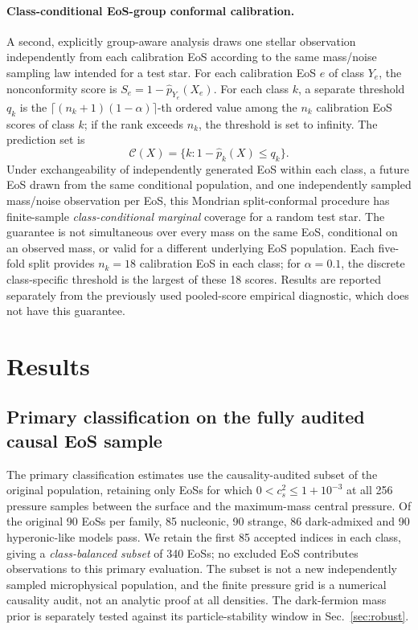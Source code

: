 \documentclass[11pt,a4paper]{article}
\begin{document}
\paragraph{Class-conditional EoS-group conformal calibration.}
A second, explicitly group-aware analysis draws one stellar observation independently from each calibration EoS according to the same mass/noise sampling law intended for a test star. For each calibration EoS $e$ of class $Y_e$, the nonconformity score is $S_e=1-\widehat p_{Y_e}(X_e)$. For each class $k$, a separate threshold $q_k$ is the $\lceil(n_k+1)(1-\alpha)\rceil$-th ordered value among the $n_k$ calibration EoS scores of class $k$; if the rank exceeds $n_k$, the threshold is set to infinity. The prediction set is
\begin{equation}
\mathcal C(X)=\{k:1-\widehat p_k(X)\le q_k\}.
\end{equation}
Under exchangeability of independently generated EoS within each class, a future EoS drawn from the same conditional population, and one independently sampled mass/noise observation per EoS, this Mondrian split-conformal procedure has finite-sample \emph{class-conditional marginal} coverage for a random test star. The guarantee is not simultaneous over every mass on the same EoS, conditional on an observed mass, or valid for a different underlying EoS population. Each five-fold split provides $n_k=18$ calibration EoS in each class; for $\alpha=0.1$, the discrete class-specific threshold is the largest of these 18 scores. Results are reported separately from the previously used pooled-score empirical diagnostic, which does not have this guarantee.

\section{Results}\label{sec:results}
\subsection{Primary classification on the fully audited causal EoS sample}\label{sec:causalprimary}
The primary classification estimates use the causality-audited subset of the original population, retaining only EoSs for which $0<c_s^2\le1+10^{-3}$ at all 256 pressure samples between the surface and the maximum-mass central pressure. Of the original 90 EoSs per family, 85 nucleonic, 90 strange, 86 dark-admixed and 90 hyperonic-like models pass. We retain the first 85 accepted indices in each class, giving a \emph{class-balanced subset} of 340 EoSs; no excluded EoS contributes observations to this primary evaluation. The subset is not a new independently sampled microphysical population, and the finite pressure grid is a numerical causality audit, not an analytic proof at all densities. The dark-fermion mass prior is separately tested against its particle-stability window in Sec.~\ref{sec:robust}.
\end{document}
